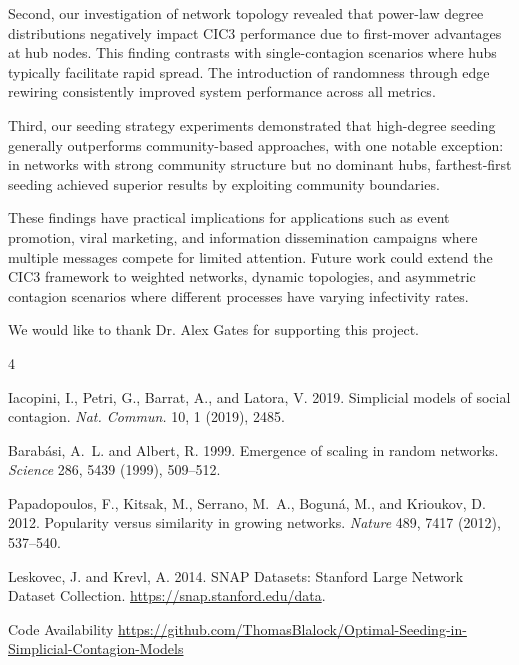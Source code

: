 \documentclass[sigconf]{acmart}
\begin{document}
Second, our investigation of network topology revealed that power-law degree distributions negatively impact CIC3 performance due to first-mover advantages at hub nodes. This finding contrasts with single-contagion scenarios where hubs typically facilitate rapid spread. The introduction of randomness through edge rewiring consistently improved system performance across all metrics.

Third, our seeding strategy experiments demonstrated that high-degree seeding generally outperforms community-based approaches, with one notable exception: in networks with strong community structure but no dominant hubs, farthest-first seeding achieved superior results by exploiting community boundaries.

These findings have practical implications for applications such as event promotion, viral marketing, and information dissemination campaigns where multiple messages compete for limited attention. Future work could extend the CIC3 framework to weighted networks, dynamic topologies, and asymmetric contagion scenarios where different processes have varying infectivity rates.

\begin{acks}
We would like to thank Dr. Alex Gates for supporting this project.
\end{acks}


\begin{thebibliography}{4}

Iacopini, I., Petri, G., Barrat, A., and Latora, V.
2019.
Simplicial models of social contagion.
\textit{Nat. Commun.} 10, 1 (2019), 2485.

Barab{\'a}si, A.~L. and Albert, R.
1999.
Emergence of scaling in random networks.
\textit{Science} 286, 5439 (1999), 509--512.

Papadopoulos, F., Kitsak, M., Serrano, M.~A., Bogun{\'a}, M., and Krioukov, D.
2012.
Popularity versus similarity in growing networks.
\textit{Nature} 489, 7417 (2012), 537--540.

Leskovec, J. and Krevl, A.
2014.
SNAP Datasets: Stanford Large Network Dataset Collection.
\url{https://snap.stanford.edu/data}.

Code Availability
\url{https://github.com/ThomasBlalock/Optimal-Seeding-in-Simplicial-Contagion-Models}

\end{thebibliography}
\end{document}
